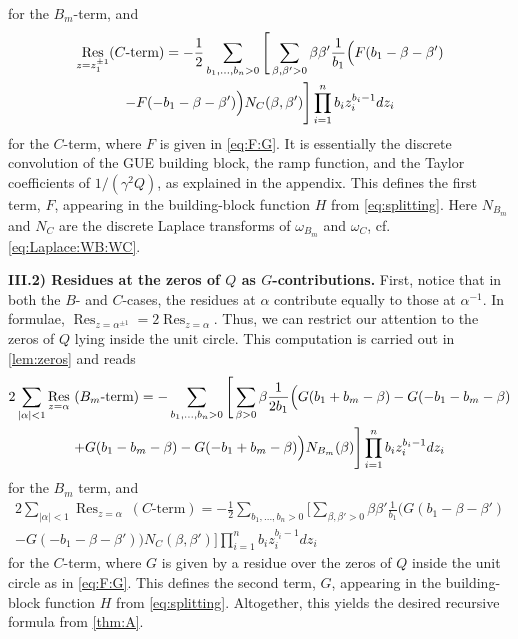 \documentclass[a4paper,11pt,english]{article}
\theoremstyle{plain}
\theoremstyle{definition}
\theoremstyle{plain}
\DeclareMathOperator*{\Res}{Res}
\begin{document}
for the $B_m$-term, and
\begin{multline}
	\Res_{z = z_1^{\pm 1}} (C\text{-term})
	=
	-
	\frac{1}{2}
	\sum_{b_1,\ldots,b_n > 0}
		\Bigg[
			\sum_{\beta, \beta' > 0}
				\beta \beta'
				\frac{1}{b_1} \Bigl(
					F(b_1 - \beta - \beta') \\
					-
					F(-b_1 - \beta - \beta')
				\Bigr) N_C(\beta,\beta')
		\Bigg] \prod_{i=1}^n b_i z_i^{b_i -1} dz_i
\end{multline}
for the $C$-term, where $F$ is given in \cref{eq:F:G}. It is essentially the discrete convolution of the GUE building block, the ramp function, and the Taylor coefficients of $1/(\gamma^2 Q)$, as explained in the appendix. This defines the first term, $F$, appearing in the building-block function $H$ from \cref{eq:splitting}. Here $N_{B_m}$ and $N_C$ are the discrete Laplace transforms of $\omega_{B_m}$ and $\omega_C$, cf. \cref{eq:Laplace:WB:WC}.

{\bfseries III.2) Residues at the zeros of $Q$ as $G$-contributions.} First, notice that in both the $B$- and $C$-cases, the residues at $\alpha$ contribute equally to those at $\alpha^{-1}$. In formulae, $\Res_{z = \alpha^{\pm 1}} = 2 \Res_{z = \alpha}$. Thus, we can restrict our attention to the zeros of $Q$ lying inside the unit circle. This computation is carried out in \cref{lem:zeros} and reads
\begin{multline}
	2 \sum_{|\alpha| < 1} \Res_{z = \alpha} \ (B_m\text{-term})
	=
	-
	\sum_{b_1,\ldots,b_n > 0}
		\Bigg[
			\sum_{\beta > 0}
				\beta 
				\frac{1}{2b_1} \Bigl(
					G(b_1 + b_m - \beta)
					-
					G(-b_1 - b_m - \beta) \\
					+
					G(b_1 - b_m - \beta)
					-
					G(-b_1 + b_m - \beta)
				\Bigr) N_{B_m}(\beta)
		\Bigg] \prod_{i=1}^n b_i z_i^{b_i -1} dz_i
\end{multline}
for the $B_m$ term, and
\begin{multline}
	2 \sum_{|\alpha| < 1} \Res_{z = \alpha} \ (C\text{-term})
	=
	-
	\frac{1}{2}
	\sum_{b_1,\ldots,b_n > 0}
		\Bigg[
			\sum_{\beta, \beta' > 0}
				\beta \beta'
				\frac{1}{b_1} \Big(
					G(b_1 - \beta - \beta') \\
					-
					G(-b_1 - \beta - \beta')
				\Big) N_C(\beta,\beta')
		\Bigg] \prod_{i=1}^n b_i z_i^{b_i -1} dz_i
\end{multline}
for the $C$-term, where $G$ is given by a residue over the zeros of $Q$ inside the unit circle as in \cref{eq:F:G}. This defines the second term, $G$, appearing in the building-block function $H$ from \cref{eq:splitting}. Altogether, this yields the desired recursive formula  from \cref{thm:A}.
\end{document}
